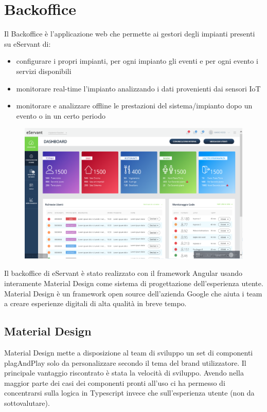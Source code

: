 \chapter{Backoffice}
Il Backoffice è l'applicazione web che permette ai gestori degli impianti presenti su eServant di:
\begin{itemize}
    \item configurare i propri impianti, per ogni impianto gli eventi e per ogni evento i servizi disponibili
    \item monitorare real-time l'impianto analizzando i dati provenienti dai sensori IoT
    \item monitorare e analizzare offline le prestazioni del sistema/impianto dopo un evento o in un certo periodo
\end{itemize}

\begin{figure}[H]
    \centering  
    \includegraphics[scale=0.4]{img/cap3/backoffice}
\end{figure}

Il backoffice di eServant è stato realizzato con il framework Angular usando interamente Material Design come
sistema di progettazione dell'esperienza utente.
Material Design è un framework open source dell'azienda Google che aiuta i team a creare esperienze digitali
di alta qualità in breve tempo.

\section{Material Design}
Material Design mette a disposizione al team di sviluppo un set di componenti plagAndPlay solo da personalizzare
secondo il tema del brand utilizzatore.
Il principale vantaggio riscontrato è stata la velocità di sviluppo. Avendo nella maggior parte dei
casi dei componenti pronti all'uso ci ha permesso di concentrarsi sulla logica in Typescript invece che
sull'esperienza utente (non da sottovalutare).\\

